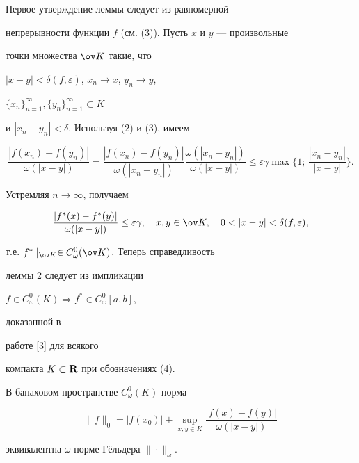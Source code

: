 \begin{pf} Первое утверждение леммы следует из равномерной


непрерывности функции $f$ (см. (3)). Пусть $x$ и $y$ --- произвольные


точки множества $\ov K$ такие, что


$|x-y|<\delta(f,\varepsilon)$, $x_n\to x$, $y_n\to y$,


$\{x_n\}^\infty_{n=1},\{y_n\}^\infty_{n=1}\subset K$


и $|x_n-y_n|<\delta$. Используя (2) и (3), имеем


$$


\frac{|f(x_n)-f(y_n)|}{\omega(|x-y|)}=


\frac{|f(x_n)-f(y_n)|}{\omega(|x_n-y_n|)}


\frac{\omega(|x_n-y_n|)}{\omega(|x-y|)}\le


\varepsilon\gamma\max\biggl\{1;\,


\frac{|x_n-y_n|}{|x-y|}\biggr\}.


$$


Устремляя $n\to\infty$, получаем


$$


\frac{|f^*(x)-f^*(y)|}{\omega(|x-y|)}\le\varepsilon\gamma, \quad


x,y\in\ov K,\quad 0<|x-y|<\delta(f,\varepsilon),


$$


т.е. $f^*\mid_{\ov K}\in C^0_\omega(\ov K)$. Теперь справедливость


леммы 2 следует из импликации


$f\in C^0_\omega(K)\Longrightarrow f^*\in C^0_\omega[a,b]$,


доказанной в


работе [3] для всякого


компакта $K\subset\bold R$ при обозначениях (4).


\end{pf}





\begin{lem} В банаховом пространстве $C^0_\omega(K)$ норма


$$


\|f\|_0=|f(x_0)|+\sup_{x,y\in K}


\frac{|f(x)-f(y)|}{\omega(|x-y|)}


$$


эквивалентна $\omega$-норме Г\"ельдера $\|\cdot\|_\omega$.


\end{lem}





